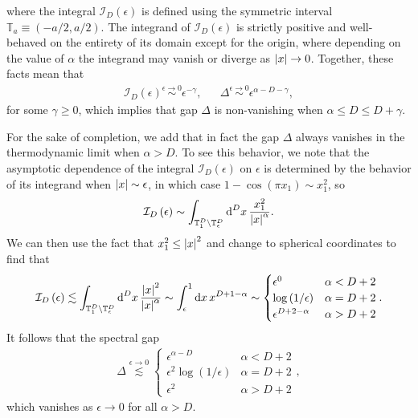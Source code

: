 \documentclass[nofootinbib,notitlepage,11pt]{revtex4-2}
\newcommand{\f}[2]{\dfrac{#1}{#2}} %
\newcommand{\p}[1]{\left(#1\right)} %
\newcommand{\1}{\mathds{1}}
\renewcommand{\d}{\text{d}}
\newcommand{\I}{\mathcal{I}}
\newcommand{\TT}{\mathbb{T}}
\begin{document}
where the integral $\I_D\p{\epsilon}$ is defined using the symmetric interval $\TT_a\equiv\p{-a/2,a/2}$.
The integrand of $\I_D\p{\epsilon}$ is strictly positive and well-behaved on the entirety of its domain except for the origin, where depending on the value of $\alpha$ the integrand may vanish or diverge as $\abs{x}\to0$.
Together, these facts mean that
\begin{align}
  \I_D\p{\epsilon} \stackrel{\epsilon\to0}{\sim} \epsilon^{-\gamma},
  &&
  \Delta \stackrel{\epsilon\to0}{\sim} \epsilon^{\alpha-D-\gamma},
\end{align}
for some $\gamma\ge0$, which implies that gap $\Delta$ is non-vanishing when $\alpha\le D\le D+\gamma$.

For the sake of completion, we add that in fact the gap $\Delta$ always vanishes in the thermodynamic limit when $\alpha>D$.
To see this behavior, we note that the asymptotic dependence of the integral $\I_D\p{\epsilon}$ on $\epsilon$ is determined by the behavior of its integrand when $\abs{x}\sim\epsilon$, in which case $1-\cos\p{\pi x_1}\sim x_1^2$, so
\begin{align}
  \I_D\p{\epsilon}
  \sim \int_{\TT_1^D\setminus\TT_\epsilon^D} \d^Dx\,
  \f{x_1^2}{\abs{x}^\alpha}.
\end{align}
We can then use the fact that $x_1^2\le\abs{x}^2$ and change to spherical coordinates to find that
\begin{align}
  \I_D\p{\epsilon} \lesssim
  \int_{\TT_1^D\setminus\TT_\epsilon^D} \d^Dx\,
  \f{\abs{x}^2}{\abs{x}^\alpha}
  \sim \int_\epsilon^1 \d x\, x^{D+1-\alpha}
  \sim
  \begin{cases}
    \epsilon^0 & \alpha < D+2 \\
    \log\p{1/\epsilon} & \alpha = D+2 \\
    \epsilon^{D+2-\alpha} & \alpha > D+2
  \end{cases}.
\end{align}
It follows that the spectral gap
\begin{align}
  \Delta \stackrel{\epsilon\to0}{\lesssim}
  \begin{cases}
    \epsilon^{\alpha-D} & \alpha < D+2 \\
    \epsilon^2 \log\p{1/\epsilon} & \alpha = D + 2 \\
    \epsilon^2 & \alpha > D+2
  \end{cases},
\end{align}
which vanishes as $\epsilon\to0$ for all $\alpha>D$.

\end{document}
